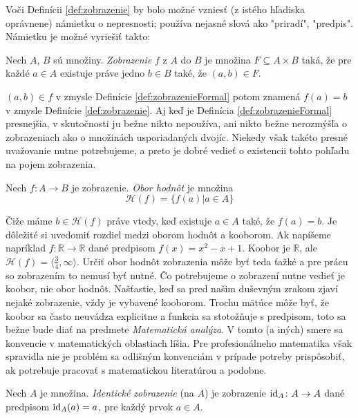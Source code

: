 Voči Definícii \ref{def:zobrazenie} by bolo možné vzniesť (z istého hľadiska oprávnene) námietku o nepresnosti; používa nejasné slová ako
"priradí", "predpis".
Námietku je možné vyriešiť takto:

\begin{definition}\label{def:zobrazenieFormal}
Nech $A$, $B$ sú množiny.
\emph{Zobrazenie} $f$ z $A$ do $B$ je množina $F \subseteq A \times B$ taká, že pre každé $a \in A$ existuje práve jedno $b \in B$ také, že $(a,b) \in F$.
\end{definition}

$(a,b) \in f$ v zmysle Definície \ref{def:zobrazenieFormal} potom znamená $f(a)=b$ v zmysle Definície
\ref{def:zobrazenie}.
Aj keď je Definícia \ref{def:zobrazenieFormal} presnejšia, v skutočnosti ju bežne nikto nepoužíva, ani nikto bežne
nerozmýšľa o zobrazeniach ako o množinách usporiadaných dvojíc.
Niekedy však takéto presné uvažovanie nutne potrebujeme, a preto je dobré vedieť o existencii tohto pohľadu na pojem zobrazenia.

\begin{definition}\label{def:oborHodnot}
Nech $f \colon A \rightarrow B$ je zobrazenie. \emph{Obor hodnôt} je množina
$$ \mathcal{H}(f) = \{f(a) | a \in A\} $$
\end{definition}
Čiže máme $b \in \mathcal{H}(f)$ práve vtedy, keď existuje $a \in A$ také, že $f(a)=b$.
Je dôležité si uvedomiť rozdiel medzi oborom hodnôt a kooborom.
Ak napíšeme napríklad
$f \colon \mathbb{R} \rightarrow \mathbb{R}$ dané predpisom $f(x) = x^2 - x + 1$.
Koobor je $\mathbb{R}$, ale $\mathcal{H}(f) = \langle\frac{3}{4}, \infty\rangle$.
Určiť obor hodnôt zobrazenia môže byť teda ťažké a pre prácu so zobrazením to nemusí
byť nutné.
Čo potrebujeme o zobrazení nutne vedieť je koobor, nie obor hodnôt.
Našťastie, keď sa pred našim duševným zrakom zjaví nejaké zobrazenie, vždy je
vybavené kooborom.
Trochu mätúce môže byť, že koobor sa často neuvádza explicitne a
funkcia sa stotožňuje s predpisom, toto sa bežne bude diať na predmete
\emph{Matematická analýza}.
V tomto (a iných) smere sa konvencie v matematických
oblastiach líšia.
Pre profesionálneho matematika však spravidla nie je problém sa
odlišným konvenciám v prípade potreby prispôsobiť, ak potrebuje pracovať s
matematickou literatúrou a podobne.
\begin{definition}\label{def:identickeZobrazenie}
Nech $A$ je množina. \emph{Identické zobrazenie} (na $A$) je zobrazenie $\mathrm{id}_A \colon A \rightarrow A$ dané predpisom $\mathrm{id}_A(a) = a$, pre každý prvok $a \in A$.
\end{definition}

